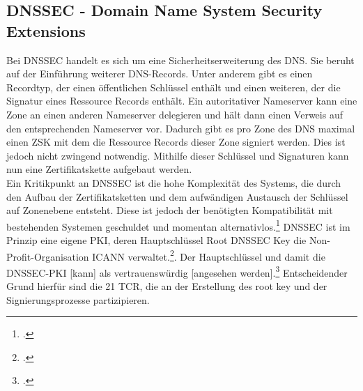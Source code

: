 \documentclass  [paper=a4,
				fontsize=12pt,
				listof=totoc,
				bibliography=totoc
				]{scrreprt}
\begin{document}
		\subsection{DNSSEC - Domain Name System Security Extensions}
		\label{subsec:dnssec}
			Bei \ac{DNSSEC} handelt es sich um eine Sicherheitserweiterung des \ac{DNS}.
			Sie beruht auf der Einführung weiterer \ac{DNS}-Records.
			Unter anderem gibt es einen Recordtyp, der einen öffentlichen Schlüssel enthält und einen weiteren, der die Signatur eines Ressource Records enthält.
			Ein autoritativer Nameserver kann eine Zone an einen anderen Nameserver delegieren und hält dann einen Verweis auf den entsprechenden Nameserver vor.
			Dadurch gibt es pro Zone des \ac{DNS} maximal einen \ac{ZSK} mit dem die Ressource Records dieser Zone signiert werden.  Dies ist jedoch nicht zwingend notwendig.
			Mithilfe dieser Schlüssel und Signaturen kann nun eine Zertifikatskette aufgebaut werden.\\
			
			Ein Kritikpunkt an \ac{DNSSEC} ist die hohe Komplexität des Systems, die durch den Aufbau der Zertifikatsketten und dem aufwändigen Austausch der Schlüssel auf Zonenebene entsteht.
			Diese ist jedoch der benötigten Kompatibilität mit bestehenden Systemen geschuldet und momentan alternativlos.\footcite[Vgl.][S. 195]{Sorge2013}
			\ac{DNSSEC} ist im Prinzip eine eigene \ac{PKI}, deren Hauptschlüssel Root DNSSEC Key die Non-Profit-Organisation \ac{ICANN} verwaltet.\footcite[Vgl.][]{Koetter2014}. Der \glqq Hauptschlüssel und damit die \ac{DNSSEC}-\ac{PKI} [kann] als vertrauenswürdig [angesehen werden].\grqq\footcite[][]{Koetter2014} Entscheidender Grund hierfür sind die 21 \ac{TCR}, die an der Erstellung des root key und der Signierungsprozesse partizipieren.
	
\end{document}
